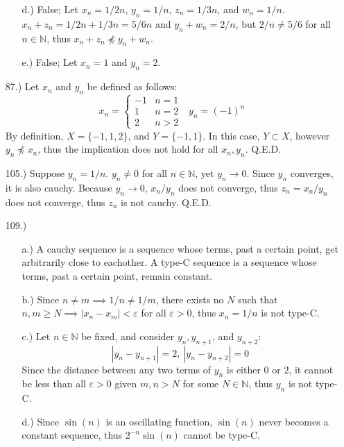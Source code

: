 \documentclass[12pt]{article}
\newcommand{\vertb}[1]{\left\vert#1\right\vert}
\newcommand{\e}{\varepsilon}
\begin{document}
\begin{itemize}
\begin{itemize}
        \item [d.)] False; Let $x_n=1/2n$, $y_n=1/n$, $z_n=1/3n$, and $w_n=1/n$. $x_n+z_n=1/2n+1/3n=5/6n$ and $y_n+w_n=2/n$, but $2/n\ne5/6$ for all $n\in\mathbb{N}$, thus $x_n+z_n\npreceq y_n+w_n$.

        \item [e.)] False; Let $x_n=1$ and $y_n=2$.
    \end{itemize}

    \item [87.)] Let $x_n$ and $y_n$ be defined as follows:
    \[x_n=\begin{cases}
        -1 & n=1\\
        1 & n=2\\
        2 & n>2
    \end{cases}\ \ \ y_n=(-1)^n\]
    By definition, $X=\{-1,1,2\}$, and $Y=\{-1,1\}$. In this case, $Y\subset X$, however $y_n\npreceq x_n$, thus the implication does not hold for all $x_n,y_n$. Q.E.D.
    
    \item [105.)] Suppose $y_n=1/n$. $y_n\ne0$ for all $n\in\mathbb{N}$, yet $y_n\to0$. Since $y_n$ converges, it is also cauchy. Because $y_n\to0$, $x_n/y_n$ does not converge, thus $z_n=x_n/y_n$ does not converge, thus $z_n$ is not cauchy. Q.E.D.

    \item [109.)] \begin{itemize}
        \item [a.)] A cauchy sequence is a sequence whose terms, past a certain point, get arbitrarily close to eachother. A type-C sequence is a sequence whose terms, past a certain point, remain constant.

        \item [b.)] Since $n\neq m\implies1/n\ne1/m$, there exists no $N$ such that $n,m\geq N\implies\vertb{x_n-x_m}<\e$ for all $\e>0$, thus $x_n=1/n$ is not type-C.

        \item [c.)] Let $n\in\mathbb{N}$ be fixed, and consider $y_n,y_{n+1}$, and $y_{n+2}$:
        \[\vertb{y_n-y_{n+1}}=2,\ \vertb{y_n-y_{n+2}}=0\]
        Since the distance between any two terms of $y_n$ is either $0$ or $2$, it cannot be less than all $\e>0$ given $m,n>N$ for some $N\in\mathbb N$, thus $y_n$ is not type-C.

        \item [d.)] Since $\sin(n)$ is an oscillating function, $\sin(n)$ never becomes a constant sequence, thus $2^{-n}\sin(n)$ cannot be type-C.


\end{itemize}
\end{itemize}
\end{document}
